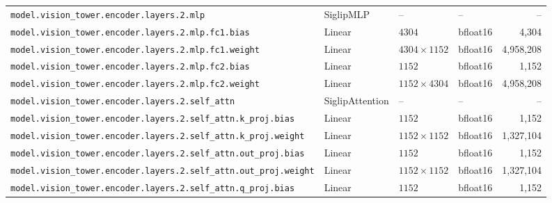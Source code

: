 \documentclass[10pt,a4paper]{article}
\theoremstyle{definition}
\begin{document}
\begin{appendices}
{\begin{longtable}{p{6.8cm}>{\raggedright\arraybackslash}p{3.3cm}llr}
\texttt{model.\allowbreak{}vision\_tower.\allowbreak{}encoder.\allowbreak{}layers.\allowbreak{}2.\allowbreak{}mlp} & Siglip\allowbreak{}MLP & -- & -- & -- \\
\texttt{model.\allowbreak{}vision\_tower.\allowbreak{}encoder.\allowbreak{}layers.\allowbreak{}2.\allowbreak{}mlp.\allowbreak{}fc1.\allowbreak{}bias} & Linear & $4304$ & bfloat16 & 4,304 \\
\texttt{model.\allowbreak{}vision\_tower.\allowbreak{}encoder.\allowbreak{}layers.\allowbreak{}2.\allowbreak{}mlp.\allowbreak{}fc1.\allowbreak{}weight} & Linear & $4304 \times 1152$ & bfloat16 & 4,958,208 \\
\texttt{model.\allowbreak{}vision\_tower.\allowbreak{}encoder.\allowbreak{}layers.\allowbreak{}2.\allowbreak{}mlp.\allowbreak{}fc2.\allowbreak{}bias} & Linear & $1152$ & bfloat16 & 1,152 \\
\texttt{model.\allowbreak{}vision\_tower.\allowbreak{}encoder.\allowbreak{}layers.\allowbreak{}2.\allowbreak{}mlp.\allowbreak{}fc2.\allowbreak{}weight} & Linear & $1152 \times 4304$ & bfloat16 & 4,958,208 \\
\texttt{model.\allowbreak{}vision\_tower.\allowbreak{}encoder.\allowbreak{}layers.\allowbreak{}2.\allowbreak{}self\_attn} & Siglip\allowbreak{}Attention & -- & -- & -- \\
\texttt{model.\allowbreak{}vision\_tower.\allowbreak{}encoder.\allowbreak{}layers.\allowbreak{}2.\allowbreak{}self\_attn.\allowbreak{}k\_proj.\allowbreak{}bias} & Linear & $1152$ & bfloat16 & 1,152 \\
\texttt{model.\allowbreak{}vision\_tower.\allowbreak{}encoder.\allowbreak{}layers.\allowbreak{}2.\allowbreak{}self\_attn.\allowbreak{}k\_proj.\allowbreak{}weight} & Linear & $1152 \times 1152$ & bfloat16 & 1,327,104 \\
\texttt{model.\allowbreak{}vision\_tower.\allowbreak{}encoder.\allowbreak{}layers.\allowbreak{}2.\allowbreak{}self\_attn.\allowbreak{}out\_proj.\allowbreak{}bias} & Linear & $1152$ & bfloat16 & 1,152 \\
\texttt{model.\allowbreak{}vision\_tower.\allowbreak{}encoder.\allowbreak{}layers.\allowbreak{}2.\allowbreak{}self\_attn.\allowbreak{}out\_proj.\allowbreak{}weight} & Linear & $1152 \times 1152$ & bfloat16 & 1,327,104 \\
\texttt{model.\allowbreak{}vision\_tower.\allowbreak{}encoder.\allowbreak{}layers.\allowbreak{}2.\allowbreak{}self\_attn.\allowbreak{}q\_proj.\allowbreak{}bias} & Linear & $1152$ & bfloat16 & 1,152 \\

\end{longtable}}
\end{appendices}
\end{document}
